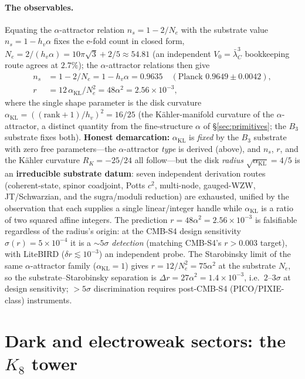 \documentclass[11pt]{article}
\newcommand{\HV}{h_v}
\begin{document}
\paragraph{The observables.} Equating the $\alpha$-attractor relation $n_s = 1 - 2/N_e$ with the substrate value $n_s = 1 - \HV\alpha$ fixes the e-fold count in closed form, $N_e = 2/(\HV\alpha) = 10\pi\sqrt{3} + 2/5 \approx 54.81$ (an independent $V_0 = \bar\lambda_C^3$ bookkeeping route agrees at $2.7\%$); the $\alpha$-attractor relations then give
\begin{align*}
n_s &= 1 - 2/N_e = 1 - \HV\alpha = 0.9635 \quad (\text{Planck } 0.9649 \pm 0.0042), \\
r &= 12\,\alpha_{\mathrm{KL}}/N_e^2 = 48\alpha^2 = 2.56\times10^{-3},
\end{align*}
where the single shape parameter is the disk curvature $\alpha_{\mathrm{KL}} = ((\text{rank}+1)/\HV)^2 = 16/25$ (the K\"ahler-manifold curvature of the $\alpha$-attractor, a distinct quantity from the fine-structure $\alpha$ of \S\ref{sec:primitives}; the $B_3$ substrate fixes both). \textbf{Honest demarcation:} $\alpha_{\mathrm{KL}}$ is \emph{fixed} by the $B_3$ substrate with zero free parameters---the $\alpha$-attractor \emph{type} is derived (above), and $n_s$, $r$, and the K\"ahler curvature $R_K = -25/24$ all follow---but the disk \emph{radius} $\sqrt{\alpha_{\mathrm{KL}}} = 4/5$ is an \textbf{irreducible substrate datum}: seven independent derivation routes (coherent-state, spinor coadjoint, Potts $c^2$, multi-node, gauged-WZW, JT/Schwarzian, and the sugra/moduli reduction) are exhausted, unified by the observation that each supplies a single linear/integer handle while $\alpha_{\mathrm{KL}}$ is a ratio of two squared affine integers. The prediction $r = 48\alpha^2 = 2.56\times10^{-3}$ is falsifiable regardless of the radius's origin: at the CMB-S4 design sensitivity $\sigma(r) = 5\times10^{-4}$ it is a $\sim\!5\sigma$ \emph{detection} (matching CMB-S4's $r > 0.003$ target), with LiteBIRD ($\delta r \lesssim 10^{-3}$) an independent probe. The Starobinsky limit of the same $\alpha$-attractor family ($\alpha_{\mathrm{KL}} = 1$) gives $r = 12/N_e^2 = 75\alpha^2$ at the substrate $N_e$, so the substrate--Starobinsky separation is $\Delta r = 27\alpha^2 = 1.4\times10^{-3}$, i.e.\ $2$--$3\sigma$ at design sensitivity; $>5\sigma$ discrimination requires post-CMB-S4 (PICO/PIXIE-class) instruments.

\section{Dark and electroweak sectors: the $K_8$ tower}
\label{sec:dark-ew}
\end{document}
